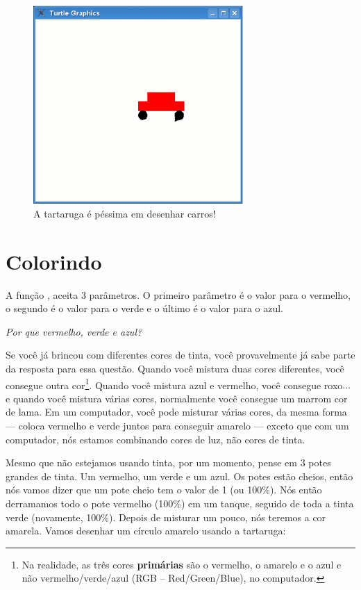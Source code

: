 \begin{figure}
\begin{center}
\includegraphics[width=80mm]{eps/figure24.eps}
\end{center}
\caption{A tartaruga é péssima em desenhar carros!}\label{fig24}
\end{figure}

\section{Colorindo}

A função , aceita 3 parâmetros. O primeiro parâmetro é o valor para o vermelho, o segundo é o valor para o verde e o último é o valor para o azul.
\par
\emph{Por que vermelho, verde e azul?}
\par
Se você já brincou com diferentes cores de tinta, você provavelmente já sabe parte da resposta para essa questão. Quando você mistura duas cores diferentes, você consegue outra cor\footnote{Na realidade, as três cores \textbf{primárias} são o vermelho, o amarelo e o azul e não vermelho/verde/azul (RGB -- Red/Green/Blue), no computador.}. Quando você mistura azul e vermelho, você consegue roxo$\ldots$ e quando você mistura várias cores, normalmente você consegue um marrom cor de lama. Em um computador, você pode misturar várias cores, da mesma forma --- coloca vermelho e verde juntos para conseguir amarelo --- exceto que com um computador, nós estamos combinando cores de luz, não cores de tinta.
 
Mesmo que não estejamos usando tinta, por um momento, pense em 3 potes grandes de tinta. Um vermelho, um verde e um azul. Os potes estão cheios, então nós vamos dizer que um pote cheio tem o valor de 1 (ou 100\%). Nós então derramamos todo o pote vermelho (100\%) em um tanque, seguido de toda a tinta verde (novamente, 100\%). Depois de misturar um pouco, nós teremos a cor amarela. Vamos desenhar um círculo amarelo usando a tartaruga:

